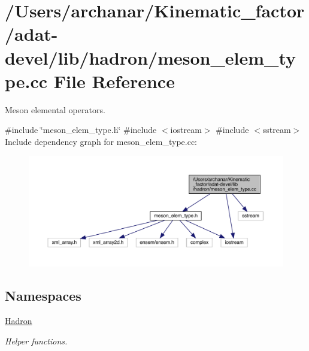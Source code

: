 \hypertarget{adat-devel_2lib_2hadron_2meson__elem__type_8cc}{}\section{/\+Users/archanar/\+Kinematic\+\_\+factor/adat-\/devel/lib/hadron/meson\+\_\+elem\+\_\+type.cc File Reference}
\label{adat-devel_2lib_2hadron_2meson__elem__type_8cc}


Meson elemental operators.  


{\ttfamily \#include \char`\"{}meson\+\_\+elem\+\_\+type.\+h\char`\"{}}\newline
{\ttfamily \#include $<$iostream$>$}\newline
{\ttfamily \#include $<$sstream$>$}\newline
Include dependency graph for meson\+\_\+elem\+\_\+type.\+cc\+:
\nopagebreak
\begin{figure}[H]
\begin{center}
\leavevmode
\includegraphics[width=350pt]{d8/d1c/adat-devel_2lib_2hadron_2meson__elem__type_8cc__incl}
\end{center}
\end{figure}
\subsection*{Namespaces}
\begin{DoxyCompactItemize}
\item 
 \mbox{\hyperlink{namespaceHadron}{Hadron}}
\begin{DoxyCompactList}\small\item\em Helper functions. \end{DoxyCompactList}\end{DoxyCompactItemize}
